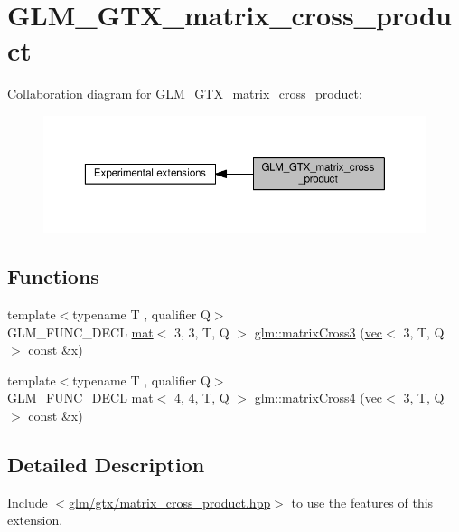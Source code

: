 \hypertarget{group__gtx__matrix__cross__product}{}\section{G\+L\+M\+\_\+\+G\+T\+X\+\_\+matrix\+\_\+cross\+\_\+product}
\label{group__gtx__matrix__cross__product}
Collaboration diagram for G\+L\+M\+\_\+\+G\+T\+X\+\_\+matrix\+\_\+cross\+\_\+product\+:
\nopagebreak
\begin{figure}[H]
\begin{center}
\leavevmode
\includegraphics[width=350pt]{d9/d75/group__gtx__matrix__cross__product}
\end{center}
\end{figure}
\subsection*{Functions}
\begin{DoxyCompactItemize}
\item 
{\footnotesize template$<$typename T , qualifier Q$>$ }\\G\+L\+M\+\_\+\+F\+U\+N\+C\+\_\+\+D\+E\+CL \hyperlink{structglm_1_1mat}{mat}$<$ 3, 3, T, Q $>$ \hyperlink{group__gtx__matrix__cross__product_ga5802386bb4c37b3332a3b6fd8b6960ff}{glm\+::matrix\+Cross3} (\hyperlink{structglm_1_1vec}{vec}$<$ 3, T, Q $>$ const \&x)
\item 
{\footnotesize template$<$typename T , qualifier Q$>$ }\\G\+L\+M\+\_\+\+F\+U\+N\+C\+\_\+\+D\+E\+CL \hyperlink{structglm_1_1mat}{mat}$<$ 4, 4, T, Q $>$ \hyperlink{group__gtx__matrix__cross__product_ga20057fff91ddafa102934adb25458cde}{glm\+::matrix\+Cross4} (\hyperlink{structglm_1_1vec}{vec}$<$ 3, T, Q $>$ const \&x)
\end{DoxyCompactItemize}


\subsection{Detailed Description}
Include $<$\hyperlink{matrix__cross__product_8hpp}{glm/gtx/matrix\+\_\+cross\+\_\+product.\+hpp}$>$ to use the features of this extension.

